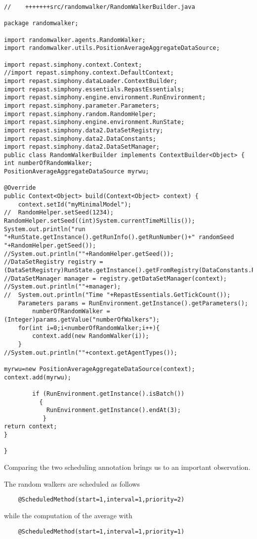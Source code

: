\documentclass{article}
\begin{document}
\begin{verbatim}
//    +++++++src/randomwalker/RandomWalkerBuilder.java

package randomwalker;

import randomwalker.agents.RandomWalker;
import randomwalker.utils.PositionAverageAggregateDataSource;

import repast.simphony.context.Context;
//import repast.simphony.context.DefaultContext;
import repast.simphony.dataLoader.ContextBuilder;
import repast.simphony.essentials.RepastEssentials;
import repast.simphony.engine.environment.RunEnvironment;
import repast.simphony.parameter.Parameters;
import repast.simphony.random.RandomHelper;
import repast.simphony.engine.environment.RunState;
import repast.simphony.data2.DataSetRegistry;
import repast.simphony.data2.DataConstants;
import repast.simphony.data2.DataSetManager;
public class RandomWalkerBuilder implements ContextBuilder<Object> {
int numberOfRandomWalker;
PositionAverageAggregateDataSource myrwu;

@Override
public Context<Object> build(Context<Object> context) {
	context.setId("myMinimalModel");
//	RandomHelper.setSeed(1234);
RandomHelper.setSeed((int)System.currentTimeMillis());
System.out.println("run "+RunState.getInstance().getRunInfo().getRunNumber()+" randomSeed "+RandomHelper.getSeed());
//System.out.println(""+RandomHelper.getSeed());
//DataSetRegistry registry = (DataSetRegistry)RunState.getInstance().getFromRegistry(DataConstants.REGISTRY_KEY);
//DataSetManager manager = registry.getDataSetManager(context);
//System.out.println(""+manager);
//	System.out.println("Time "+RepastEssentials.GetTickCount());
	Parameters params = RunEnvironment.getInstance().getParameters();
       	numberOfRandomWalker = (Integer)params.getValue("numberOfWalkers");
	for(int i=0;i<numberOfRandomWalker;i++){
		context.add(new RandomWalker(i));
	}
//System.out.println(""+context.getAgentTypes());

myrwu=new PositionAverageAggregateDataSource(context);
context.add(myrwu);

        if (RunEnvironment.getInstance().isBatch())
          {
            RunEnvironment.getInstance().endAt(3);
           }
return context;
}

}

\end{verbatim}


Comparing the two scheduling annotation brings us to an important observation.

The random walkers are scheduled as follows
\begin{verbatim}
	@ScheduledMethod(start=1,interval=1,priority=2)
\end{verbatim}
while the computation of the average with
\begin{verbatim}
	@ScheduledMethod(start=1,interval=1,priority=1)
\end{verbatim}
\end{document}
